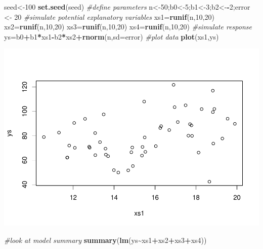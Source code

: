 \documentclass[
]{book}
\newenvironment{Shaded}{\begin{snugshade}}{\end{snugshade}}
\newcommand{\AttributeTok}[1]{\textcolor[rgb]{0.13,0.29,0.53}{#1}}
\newcommand{\CommentTok}[1]{\textcolor[rgb]{0.56,0.35,0.01}{\textit{#1}}}
\newcommand{\DecValTok}[1]{\textcolor[rgb]{0.00,0.00,0.81}{#1}}
\newcommand{\FunctionTok}[1]{\textcolor[rgb]{0.13,0.29,0.53}{\textbf{#1}}}
\newcommand{\NormalTok}[1]{#1}
\newcommand{\OtherTok}[1]{\textcolor[rgb]{0.56,0.35,0.01}{#1}}
\newcommand{\SpecialCharTok}[1]{\textcolor[rgb]{0.81,0.36,0.00}{\textbf{#1}}}
\begin{document}
\begin{Shaded}
\begin{Highlighting}[]
\NormalTok{seed}\OtherTok{\textless{}{-}}\DecValTok{100}
\FunctionTok{set.seed}\NormalTok{(seed)}
\CommentTok{\#define parameters}
\NormalTok{n}\OtherTok{\textless{}{-}}\DecValTok{50}\NormalTok{;b0}\OtherTok{\textless{}{-}}\DecValTok{5}\NormalTok{;b1}\OtherTok{\textless{}{-}}\DecValTok{3}\NormalTok{;b2}\OtherTok{\textless{}{-}}\SpecialCharTok{{-}}\DecValTok{2}\NormalTok{;error }\OtherTok{\textless{}{-}} \DecValTok{20}
\CommentTok{\#simulate potential explanatory variables}
\NormalTok{xs1}\OtherTok{=}\FunctionTok{runif}\NormalTok{(n,}\DecValTok{10}\NormalTok{,}\DecValTok{20}\NormalTok{)}
\NormalTok{xs2}\OtherTok{=}\FunctionTok{runif}\NormalTok{(n,}\DecValTok{10}\NormalTok{,}\DecValTok{20}\NormalTok{)}
\NormalTok{xs3}\OtherTok{=}\FunctionTok{runif}\NormalTok{(n,}\DecValTok{10}\NormalTok{,}\DecValTok{20}\NormalTok{)}
\NormalTok{xs4}\OtherTok{=}\FunctionTok{runif}\NormalTok{(n,}\DecValTok{10}\NormalTok{,}\DecValTok{20}\NormalTok{)}
\CommentTok{\#simulate response}
\NormalTok{ys}\OtherTok{=}\NormalTok{b0}\SpecialCharTok{+}\NormalTok{b1}\SpecialCharTok{*}\NormalTok{xs1}\SpecialCharTok{{-}}\NormalTok{b2}\SpecialCharTok{*}\NormalTok{xs2}\SpecialCharTok{+}\FunctionTok{rnorm}\NormalTok{(n,}\AttributeTok{sd=}\NormalTok{error)}
\CommentTok{\#plot data}
\FunctionTok{plot}\NormalTok{(xs1,ys)}
\end{Highlighting}
\end{Shaded}

\includegraphics{ECOMODbook_files/figure-latex/a7.6-1.pdf}

\begin{Shaded}
\begin{Highlighting}[]
\CommentTok{\#look at model summary}
\FunctionTok{summary}\NormalTok{(}\FunctionTok{lm}\NormalTok{(ys}\SpecialCharTok{\textasciitilde{}}\NormalTok{xs1}\SpecialCharTok{+}\NormalTok{xs2}\SpecialCharTok{+}\NormalTok{xs3}\SpecialCharTok{+}\NormalTok{xs4))}
\end{Highlighting}
\end{Shaded}
\end{document}
